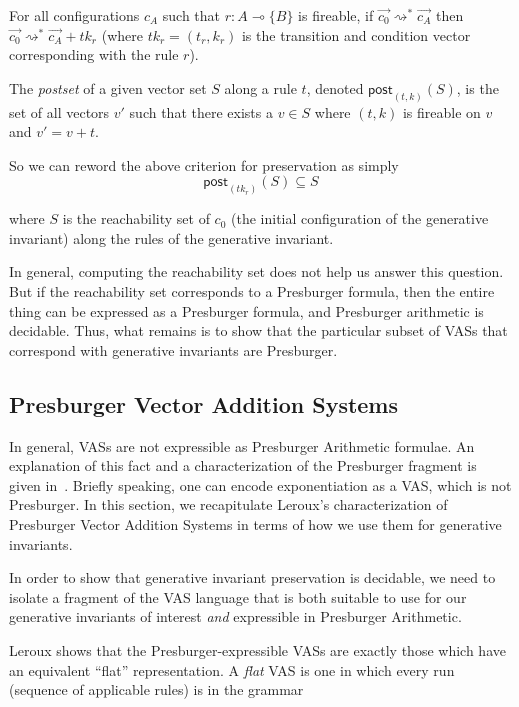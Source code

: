 \documentclass[fullpage, 11pt]{article}
\newcommand{\lolli}{\multimap}
\newcommand{\mon}[1]{\{#1\}}
\newcommand{\stepsto}{\rightsquigarrow}
\begin{document}
For all configurations $c_{A}$ such that $r : A \lolli \mon{B}$ is
fireable, if $\vec{c_0} \stepsto^* \vec{c_{A}}$ then $\vec{c_0} \stepsto^*
\vec{c_{A}} + tk_r$ (where $tk_r = (t_r, k_r)$ is the transition and
condition vector corresponding with the rule $r$).

The {\em postset} of a given vector set $S$ along a rule $t$, denoted
$\mathsf{post}_{(t,k)}(S)$, is the set of all vectors $v'$ such that there exists
a $v \in S$ where $(t,k)$ is fireable on $v$ and $v' = v + t$.

So we can reword the above criterion for preservation as simply
\[
\mathsf{post}_{(tk_r)}(S) \subseteq S
\]

where $S$ is the reachability set of $c_0$ (the initial configuration of
the generative invariant) along the rules of the generative invariant.

In general, computing the reachability set does not help us answer this
question. But if the reachability set corresponds to a Presburger formula,
then the entire thing can be expressed as a Presburger formula, and
Presburger arithmetic is decidable. Thus, what remains is to show that the
particular subset of VASs that correspond with generative invariants are
Presburger.


\subsection{Presburger Vector Addition Systems}

In general, VASs are not expressible as Presburger Arithmetic formulae.
An explanation of this fact and a characterization of the Presburger
fragment is given in~\cite{Leroux2013PresburgerVAS}.
Briefly speaking, one can encode exponentiation as a
VAS, which is not Presburger. In this section, we recapitulate Leroux's
characterization of Presburger Vector Addition Systems in terms of how we
use them for generative invariants.

In order to show that generative invariant preservation is decidable, we
need to isolate a fragment of the VAS language that is both suitable to use
for our generative invariants of interest {\em and} expressible in
Presburger Arithmetic.

Leroux shows that the Presburger-expressible VASs are exactly those which
have an equivalent ``flat'' representation. A {\em flat} VAS is one in
which every run (sequence of applicable rules) is in the grammar
\end{document}
